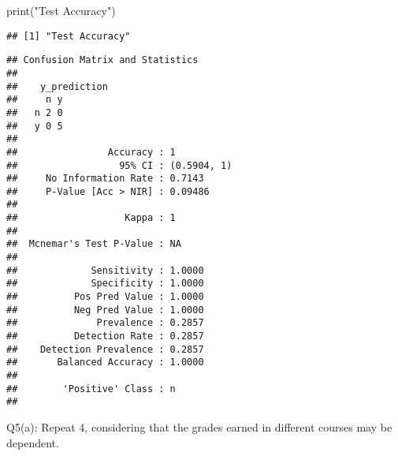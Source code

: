 \documentclass[
]{article}
\newenvironment{Shaded}{\begin{snugshade}}{\end{snugshade}}
\newcommand{\FunctionTok}[1]{\textcolor[rgb]{0.00,0.00,0.00}{#1}}
\newcommand{\NormalTok}[1]{#1}
\newcommand{\OtherTok}[1]{\textcolor[rgb]{0.56,0.35,0.01}{#1}}
\newcommand{\SpecialCharTok}[1]{\textcolor[rgb]{0.00,0.00,0.00}{#1}}
\newcommand{\StringTok}[1]{\textcolor[rgb]{0.31,0.60,0.02}{#1}}
\begin{document}
\begin{Shaded}
\begin{Highlighting}[]
\FunctionTok{print}\NormalTok{(}\StringTok{"Test Accuracy"}\NormalTok{)}
\end{Highlighting}
\end{Shaded}

\begin{verbatim}
## [1] "Test Accuracy"
\end{verbatim}

\begin{Shaded}
\end{Shaded}

\begin{verbatim}
## Confusion Matrix and Statistics
## 
##    y_prediction
##     n y
##   n 2 0
##   y 0 5
##                                      
##                Accuracy : 1          
##                  95% CI : (0.5904, 1)
##     No Information Rate : 0.7143     
##     P-Value [Acc > NIR] : 0.09486    
##                                      
##                   Kappa : 1          
##                                      
##  Mcnemar's Test P-Value : NA         
##                                      
##             Sensitivity : 1.0000     
##             Specificity : 1.0000     
##          Pos Pred Value : 1.0000     
##          Neg Pred Value : 1.0000     
##              Prevalence : 0.2857     
##          Detection Rate : 0.2857     
##    Detection Prevalence : 0.2857     
##       Balanced Accuracy : 1.0000     
##                                      
##        'Positive' Class : n          
## 
\end{verbatim}

Q5(a): Repeat 4, considering that the grades earned in different courses
may be dependent.
\end{document}
